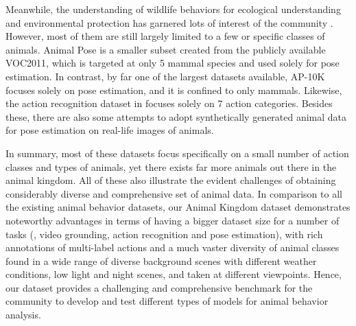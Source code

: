 \documentclass[10pt,twocolumn,letterpaper]{article}
\begin{document}
    Meanwhile, the understanding of wildlife behaviors for ecological understanding and environmental protection \cite{ani11020485} has garnered lots of interest of the community \cite{ani11020485, schindler2021identification, cao2019cross, yu2021apk, liwildlife}. However, most of them are still largely limited to a few or specific classes of animals. Animal Pose \cite{cao2019cross} is a smaller subset created from the publicly available VOC2011, which is targeted at only 5 mammal species and used solely for pose estimation. In contrast, by far one of the largest datasets available, AP-10K \cite{yu2021apk} focuses solely on pose estimation, and it is confined to only mammals. Likewise, the action recognition dataset in \cite{liwildlife} focuses solely on 7 action categories. Besides these, there are also some attempts to adopt synthetically generated animal data \cite{mu2020learning,shooter2021sydog} 
    for pose estimation on real-life images of animals. 
    
    In summary, most of these datasets focus specifically on a small number of action classes and types of animals, yet there exists far more animals out there in the animal kingdom. All of these also illustrate the evident challenges of obtaining considerably diverse and comprehensive set of animal data. In comparison to all the existing animal behavior datasets, our Animal Kingdom dataset demonstrates noteworthy advantages in terms of having a bigger dataset size for a number of tasks (\ie, video grounding, action recognition and pose estimation), with rich annotations of multi-label actions and a much vaster diversity of animal classes found in a wide range of diverse background scenes with different weather conditions, low light and night scenes, and taken at different viewpoints. Hence, our dataset provides a challenging and comprehensive benchmark for the community to develop and test different types of models for animal behavior analysis.
    
    
    
\end{document}
